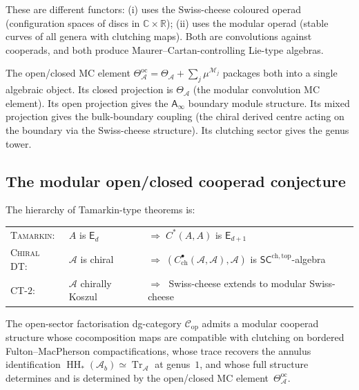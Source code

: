 \documentclass[11pt]{article}
\newcommand{\cA}{\mathcal{A}}
\newcommand{\cC}{\mathcal{C}}
\newcommand{\cM}{\mathcal{M}}
\newcommand{\C}{\mathbb{C}}
\newcommand{\R}{\mathbb{R}}
\newcommand{\Ainf}{\mathsf{A}_{\infty}}
\newcommand{\SCchtop}{\mathsf{SC}^{\mathrm{ch,top}}}
\newcommand{\HH}{\operatorname{HH}}
\newcommand{\Tr}{\operatorname{Tr}}
\begin{document}
\smallskip

\noindent
These are different functors: (i) uses the Swiss-cheese coloured
operad (configuration spaces of discs in $\C \times \R$);
(ii) uses the modular operad (stable curves of all genera with
clutching maps).  Both are convolutions against cooperads, and
both produce Maurer--Cartan-controlling Lie-type algebras.

The open/closed MC element $\Theta^{\mathrm{oc}}_\cA = \Theta_\cA
+ \sum_j \mu^{\cM_j}$ packages both into a single algebraic
object.  Its closed projection is $\Theta_\cA$ (the modular
convolution MC element).  Its open projection gives the $\Ainf$
boundary module structure.  Its mixed projection gives the
bulk-boundary coupling (the chiral derived centre acting on the
boundary via the Swiss-cheese structure).  Its clutching sector
gives the genus tower.


\subsection{The modular open/closed cooperad conjecture}

The hierarchy of Tamarkin-type theorems is:

\begin{center}
\renewcommand{\arraystretch}{1.4}
\begin{tabular}{@{}p{3.3cm}p{3.3cm}p{5.5cm}@{}}
\textsc{Tamarkin:}
  & $A$ is $\mathsf{E}_d$
  & $\Longrightarrow\; C^*(A,A)$ is $\mathsf{E}_{d+1}$ \\[2pt]
\textsc{Chiral DT:}
  & $\cA$ is chiral
  & $\Longrightarrow\; (C^\bullet_{\mathrm{ch}}(\cA,\cA), \cA)$
    is $\SCchtop$-algebra \\[2pt]
\textsc{CT-$2$:}
  & $\cA$ chirally Koszul
  & $\Longrightarrow\;$ Swiss-cheese extends to
    modular Swiss-cheese
\end{tabular}
\end{center}

\begin{conjecture}
\label{conj:ct2-vol2}
The open-sector factorisation dg-category $\cC_{\mathrm{op}}$
admits a modular cooperad structure whose cocomposition maps are
compatible with clutching on bordered Fulton--MacPherson
compactifications, whose trace recovers the annulus identification
$\HH_*(\cA_b) \simeq \Tr_\cA$ at genus~$1$, and whose full
structure determines and is determined by the open/closed MC
element~$\Theta^{\mathrm{oc}}_\cA$.
\end{conjecture}
\end{document}
